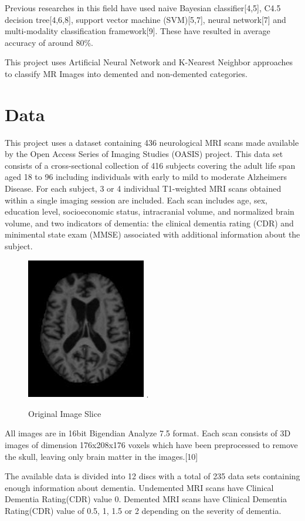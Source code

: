 \documentclass[journal,twoside]{IEEEtran}
\begin{document}
\par Previous researches in this field have used naive Bayesian classifier[4,5], C4.5 decision tree[4,6,8], support vector machine (SVM)[5,7], neural network[7] and multi-modality classification framework[9]. These have resulted in average accuracy of around 80\%. 
\par This project uses Artificial Neural Network and K-Nearest Neighbor approaches to classify MR Images into demented and non-demented categories.
\section{Data}
This project uses a dataset containing 436 neurological MRI scans made available by the Open Access Series of Imaging Studies (OASIS) project. This data set consists of a cross-sectional collection of 416 subjects covering the adult life span aged 18 to 96 including individuals with early to mild to moderate Alzheimer\textquotesingle s Disease. For each subject, 3 or 4 individual T1-weighted MRI scans obtained within a single imaging session are included. Each scan includes age, sex, education level, socioeconomic status, intracranial volume, and normalized brain volume, and two indicators of dementia: the clinical dementia rating (CDR) and minimental state exam (MMSE) associated with additional information about the subject. 
\begin{figure}[h!]
\centering
\includegraphics[width=2.05in]{5.jpg}
\DeclareGraphicsExtensions.
\caption{Original Image Slice}
\end{figure}
\par All images are in 16bit Bigendian Analyze 7.5 format. Each scan consists of 3D images of dimension 176x208x176 voxels which have been preprocessed to remove the skull, leaving only brain matter in the images.[10] 
\par The available data is divided into 12 discs with a total of 235 data sets containing enough information about dementia. Undemented MRI scans have Clinical Dementia Rating(CDR) value 0. Demented MRI scans have Clinical Dementia Rating(CDR) value of 0.5, 1, 1.5 or 2 depending on the severity of dementia.
\end{document}
